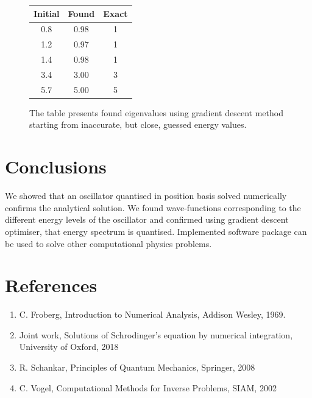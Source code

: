 \documentclass{llncs}
\begin{document}
\begin{figure}
  \centering
  \begin{tabular}{| c | c | c |}
    \hline
    Initial & Found & Exact\\
    \hline
    0.8 & 0.98 & 1 \\
    1.2 & 0.97 & 1 \\
    1.4 & 0.98 & 1 \\
    3.4 & 3.00 & 3 \\
    5.7 & 5.00 & 5 \\
    \hline
  \end{tabular}
  \caption{The table presents found eigenvalues using gradient descent method starting from inaccurate, but close, guessed energy values.}
  \label{tab:eigens}
\end{figure}

\section{Conclusions}

We showed that an oscillator quantised in position basis solved numerically confirms the analytical solution. We found wave-functions corresponding to the different energy levels of the oscillator and confirmed using gradient descent optimiser, that energy spectrum is quantised. Implemented software package can be used to solve other computational physics problems.

\section{References}
\begin{enumerate}
	\item C. Froberg, Introduction to Numerical Analysis, Addison Wesley, 1969.
	\item Joint work, Solutions of Schrodinger's equation by numerical integration, University of Oxford, 2018
	\item R. Schankar, Principles of Quantum Mechanics, Springer, 2008
  \item C. Vogel, Computational Methods for Inverse Problems, SIAM, 2002
\end{enumerate}
\end{document}
